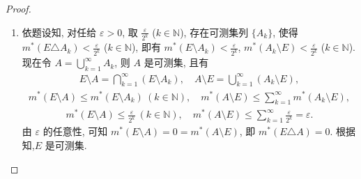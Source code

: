 \documentclass[../../main.tex]{subfiles}%
\begin{document}
\begin{proof}
\begin{enumerate}[(1)]
\item 依题设知, 对任给 $\varepsilon>0$, 取 $\frac{\varepsilon}{2^k}$ ($k\in\mathbb{N}$), 存在可测集列 $\{A_k\}$, 使得 $m^*(E\triangle A_k)<\frac{\varepsilon}{2^k}$ ($k\in\mathbb{N}$), 即有 $m^*(E\setminus A_k)<\frac{\varepsilon}{2^k}$, $m^*(A_k\setminus E)<\frac{\varepsilon}{2^k}$ ($k\in\mathbb{N}$). 现在令 $A=\bigcup\limits_{k=1}^{\infty}A_k$, 则 $A$ 是可测集, 且有
\begin{align*}
E\setminus A=\bigcap\limits_{k=1}^{\infty}(E\setminus A_k),\quad A\setminus E=\bigcup\limits_{k=1}^{\infty}(A_k\setminus E),
\end{align*}
\begin{align*}
m^*(E\setminus A)\leqslant m^*(E\setminus A_k)\ (k\in\mathbb{N}),\quad m^*(A\setminus E)\leqslant\sum\limits_{k=1}^{\infty}m^*(A_k\setminus E),
\end{align*}
\begin{align*}
m^*(E\setminus A)\leqslant\frac{\varepsilon}{2^k}\ (k\in\mathbb{N}),\quad m^*(A\setminus E)\leqslant\sum\limits_{k=1}^{\infty}\frac{\varepsilon}{2^k}=\varepsilon.
\end{align*}
由 $\varepsilon$ 的任意性, 可知 $m^*(E\setminus A)=0=m^*(A\setminus E)$, 即 $m^*(E\triangle A)=0$. 根据知,$E$ 是可测集.
\end{enumerate}

\end{proof}
\end{document}
